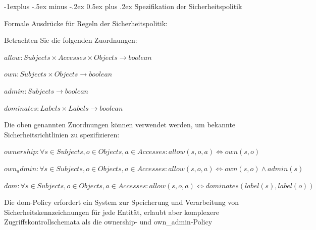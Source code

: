 \documentclass[a4paper]{article}
\makeatletter
\renewcommand{\subsection}{\@startsection{subsection}{2}{0mm}%
 {-1explus -.5ex minus -.2ex}%
 {0.5ex plus .2ex}%
 {\normalfont\normalsize\bfseries}}
\makeatother
\begin{document}
\begin{multicols}{3}
      \subsection{Spezifikation der Sicherheitspolitik}
      \begin{itemize*}
            \item Formale Ausdrücke für Regeln der Sicherheitspolitik:
            \item Betrachten Sie die folgenden Zuordnungen:
            \begin{itemize*}
                  \item $allow: Subjects \times Accesses \times Objects \rightarrow boolean$
                  \item $own: Subjects \times Objects \rightarrow boolean$
                  \item $admin: Subjects \rightarrow boolean$
                  \item $dominates: Labels \times Labels \rightarrow boolean$
            \end{itemize*}
            \item Die oben genannten Zuordnungen können verwendet werden, um bekannte
            Sicherheitsrichtlinien zu spezifizieren:
            \begin{itemize*}
                  \item $ownership: \forall s \in Subjects, o \in Objects, a \in Accesses: allow(s, o, a) \Leftrightarrow own(s, o)$
                  \item $own_admin: \forall s \in Subjects, o \in Objects, a \in Accesses: allow(s, o, a) \Leftrightarrow own(s, o) \wedge admin(s)$
                  \item $dom: \forall s \in Subjects, o \in Objects, a \in Accesses: allow(s, o, a) \Leftrightarrow dominates(label(s), label(o))$
            \end{itemize*}
            \item Die dom-Policy erfordert ein System zur Speicherung und Verarbeitung von Sicherheitskennzeichnungen für jede Entität, erlaubt aber komplexere Zugriffskontrollschemata als die ownership- und own\_admin-Policy
      \end{itemize*}


\end{multicols}
\end{document}
